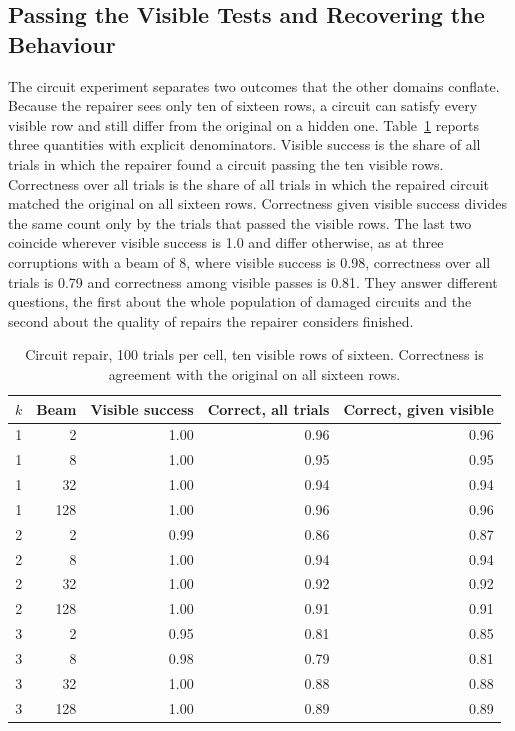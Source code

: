 \documentclass[11pt]{article}
\begin{document}
\subsection{Passing the Visible Tests and Recovering the Behaviour}

The circuit experiment separates two outcomes that the other domains conflate. Because the repairer sees only ten of sixteen rows, a circuit can satisfy every visible row and still differ from the original on a hidden one. Table~\ref{tab:circ} reports three quantities with explicit denominators. Visible success is the share of all trials in which the repairer found a circuit passing the ten visible rows. Correctness over all trials is the share of all trials in which the repaired circuit matched the original on all sixteen rows. Correctness given visible success divides the same count only by the trials that passed the visible rows. The last two coincide wherever visible success is 1.0 and differ otherwise, as at three corruptions with a beam of 8, where visible success is 0.98, correctness over all trials is 0.79 and correctness among visible passes is 0.81. They answer different questions, the first about the whole population of damaged circuits and the second about the quality of repairs the repairer considers finished.

\begin{table}[ht]
\centering
\caption{Circuit repair, 100 trials per cell, ten visible rows of sixteen. Correctness is agreement with the original on all sixteen rows.}
\label{tab:circ}
\begin{tabular}{rrrrr}
\toprule
$k$ & Beam & Visible success & Correct, all trials & Correct, given visible\\
\midrule
1 & 2 & 1.00 & 0.96 & 0.96\\
1 & 8 & 1.00 & 0.95 & 0.95\\
1 & 32 & 1.00 & 0.94 & 0.94\\
1 & 128 & 1.00 & 0.96 & 0.96\\
2 & 2 & 0.99 & 0.86 & 0.87\\
2 & 8 & 1.00 & 0.94 & 0.94\\
2 & 32 & 1.00 & 0.92 & 0.92\\
2 & 128 & 1.00 & 0.91 & 0.91\\
3 & 2 & 0.95 & 0.81 & 0.85\\
3 & 8 & 0.98 & 0.79 & 0.81\\
3 & 32 & 1.00 & 0.88 & 0.88\\
3 & 128 & 1.00 & 0.89 & 0.89\\
\bottomrule
\end{tabular}
\end{table}
\end{document}
